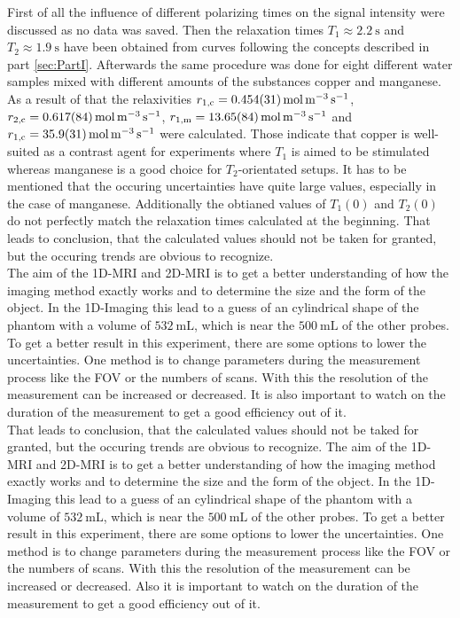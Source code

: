 First of all the influence of different polarizing times on the signal intensity were discussed as no data was saved. Then the relaxation times $T_1 \approx \SI{2.2}{\second}$ and $T_2 \approx \SI{1.9}{\second}$ have been obtained from curves following the concepts described in part \ref{sec:PartI}. Afterwards the same procedure was done for eight different water samples mixed with different amounts of the substances copper and manganese. As a result of that the relaxivities $r_{\text{1,c}} = \SI{0.454 \pm 0.031}{\mole \per \metre \tothe{3} \per \second}$, $r_{\text{2,c}} = \SI{0.617 \pm 0.084}{\mole \per \metre \tothe{3} \per \second}$, $r_{\text{1,m}} = \SI{13.65 \pm 0.84}{\mole \per \metre \tothe{3} \per \second}$ and $r_{\text{1,c}} = \SI{35.9 \pm 3.1}{\mole \per \metre \tothe{3} \per \second}$ were calculated. 
Those indicate that copper is well-suited as a contrast agent for experiments where $T_1$ is aimed to be stimulated whereas manganese is a good choice for $T_2$-orientated setups.
It has to be mentioned that the occuring uncertainties have quite large values, especially in the case of manganese.
Additionally the obtianed values of $T_1(0)$ and $T_2(0)$ do not perfectly match the relaxation times calculated at the beginning.
That leads to conclusion, that the calculated values should not be taken for granted, but the occuring trends are obvious to recognize.\\
The aim of the 1D-MRI and 2D-MRI is to get a better understanding of how the imaging method exactly works and to determine the size and the form of the object. In the 1D-Imaging this lead to a guess of an cylindrical shape of the phantom with a volume of $\SI{532}{\milli\liter}$, which is near the $\SI{500}{\milli\liter}$ of the other probes. To get a better result in this experiment, there are some options to lower the uncertainties. One method is to change parameters during the measurement process like the FOV or the numbers of scans. With this the resolution of the measurement can be increased or decreased. It is also important to watch on the duration of the measurement to get a good efficiency out of it. \\
That leads to conclusion, that the calculated values should not be taked for granted, but the occuring trends are obvious to recognize.
The aim of the 1D-MRI and 2D-MRI is to get a better understanding of how the imaging method exactly works and to determine the size and the form of the object. In the 1D-Imaging this lead to a guess of an cylindrical shape of the phantom with a volume of $\SI{532}{\milli\liter}$, which is near the $\SI{500}{\milli\liter}$ of the other probes. To get a better result in this experiment, there are some options to lower the uncertainties. One method is to change parameters during the measurement process like the FOV or the numbers of scans. With this the resolution of the measurement can be increased or decreased. Also it is important to watch on the duration of the measurement to get a good efficiency out of it. \\
